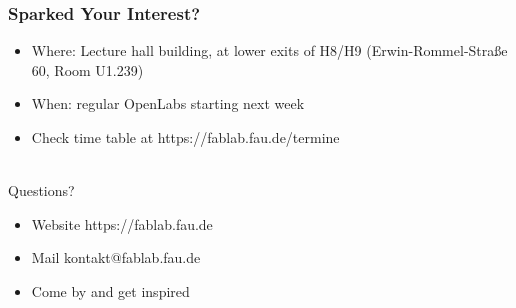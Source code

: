 \documentclass[t]{beamer}
\begin{document}
\begin{frame}
    \frametitle{Sparked Your Interest?}

    \begin{itemize}
        \item Where: Lecture hall building, at lower exits of H8/H9 (Erwin-Rommel-Straße 60, Room U1.239)
        \item When: regular OpenLabs starting next week
        \item Check time table at {\color{blue} https://fablab.fau.de/termine}
    \end{itemize}
    ~\\
    Questions?
    \begin{itemize}
        \item Website {\color{blue} https://fablab.fau.de}
        \item Mail {\color{blue} kontakt@fablab.fau.de}
        \item Come by and get inspired
    \end{itemize}
\end{frame}
\end{document}

